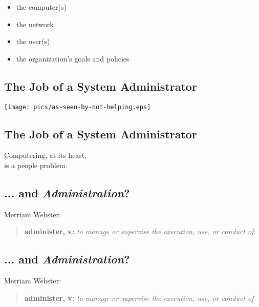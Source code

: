 \documentclass[xga]{xdvislides}
\begin{document}
\begin{itemize}
	\item the computer(s)
	\item the network
\end{itemize}
\vspace{.2in}

\begin{itemize}
	\item the user(s)
	\item the organization's goals and policies
\end{itemize}

\subsection{The Job of a System Administrator}
\vspace*{\fill}
\begin{center}
	\texttt{[image: pics/as-seen-by-not-helping.eps]} \\
\end{center}
\vspace*{\fill}

\subsection{The Job of a System Administrator}
\Huge
\vspace*{\fill}
\begin{center}
Computering, at its heart,\\
is a people problem.
\end{center}
\vspace*{\fill}
\Normalsize



\subsection{... and {\em Administration}?}
Merriam Webster:
\begin{quote}
	{\bf administer, v:} {\em to manage or supervise the execution, use, or conduct of} \\
\end{quote}


\subsection{... and {\em Administration}?}
Merriam Webster:
\begin{quote}
	{\bf administer, v:} {\em to manage or supervise the execution, use, or conduct of} \\
\end{quote}
\end{document}
